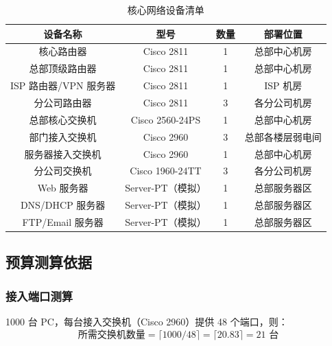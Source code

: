 \documentclass[12pt,a4paper]{ctexart}
\begin{document}
\begin{table}[H]
\centering
\caption{核心网络设备清单}
\label{tab:device-list}
\begin{tabular}{|c|c|c|c|}
\hline
\textbf{设备名称}       & \textbf{型号}           & \textbf{数量} & \textbf{部署位置}   \\ \hline
核心路由器              & Cisco 2811              & 1             & 总部中心机房         \\ \hline
总部顶级路由器          & Cisco 2811              & 1             & 总部中心机房         \\ \hline
ISP 路由器/VPN 服务器   & Cisco 2811              & 1             & ISP 机房             \\ \hline
分公司路由器            & Cisco 2811              & 3             & 各分公司机房         \\ \hline
总部核心交换机          & Cisco 2560-24PS         & 1             & 总部中心机房         \\ \hline
部门接入交换机          & Cisco 2960              & 3             & 总部各楼层弱电间     \\ \hline
服务器接入交换机        & Cisco 2960              & 1             & 总部中心机房         \\ \hline
分公司交换机            & Cisco 1960-24TT         & 3             & 各分公司机房         \\ \hline
Web 服务器              & Server-PT（模拟）       & 1             & 总部服务器区         \\ \hline
DNS/DHCP 服务器         & Server-PT（模拟）       & 1             & 总部服务器区         \\ \hline
FTP/Email 服务器        & Server-PT（模拟）       & 1             & 总部服务器区         \\ \hline
\end{tabular}
\end{table}

\subsection{预算测算依据}

\subsubsection{接入端口测算}

1000 台 PC，每台接入交换机（Cisco 2960）提供 48 个端口，则：
\[
\text{所需交换机数量} = \lceil 1000 / 48 \rceil = \lceil 20.83 \rceil = 21 \text{ 台}
\]
\end{document}

